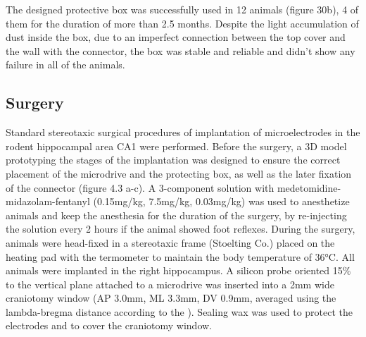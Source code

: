 The designed protective box was successfully used in 12 animals (figure 30b), 4 of them for the duration of more than 2.5 months. Despite the light accumulation of dust inside the box, due to an imperfect connection between the top cover and the wall with the connector, the box was stable and reliable and didn’t show any failure in all of the animals.


\subsection{Surgery}

Standard stereotaxic surgical procedures of implantation of microelectrodes in the rodent hippocampal area CA1 were performed. Before the surgery, a 3D model prototyping the stages of the implantation was designed to ensure the correct placement of the microdrive and the protecting box, as well as the later fixation of the connector (figure 4.3 a-c). A 3-component solution with medetomidine-midazolam-fentanyl (0.15mg/kg, 7.5mg/kg, 0.03mg/kg) was used to anesthetize animals and keep the anesthesia for the duration of the surgery, by re-injecting the solution every 2 hours if the animal showed foot reflexes. During the surgery, animals were head-fixed in a stereotaxic frame (Stoelting Co.) placed on the heating pad with the termometer to maintain the body temperature of 36°C. All animals were implanted in the right hippocampus. A silicon probe oriented 15\% to the vertical plane attached to a microdrive was inserted into a 2mm wide craniotomy window (AP 3.0mm, ML 3.3mm, DV 0.9mm, averaged using the lambda-bregma distance according to the \cite{Radtke-Schuller2016}). Sealing wax was used to protect the electrodes and to cover the craniotomy window.

